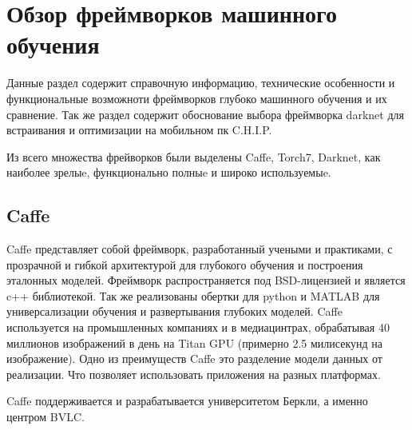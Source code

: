 \documentclass[a4paper,english,russian]{G2-105}
\begin{document}
\chapter{Обзор фреймворков машинного обучения}
\par Данные раздел содержит справочную информацию, технические особенности и функциональные возможноти фреймворков глубоко машинного обучения и их сравнение. Так же раздел содержит обоснование выбора фреймворка darknet для встраивания и оптимизации на мобильном пк C.H.I.P.
\par Из всего множества фрейворков были выделены Caffe, Torch7, Darknet, как наиболее зрелыe, функционально полныe и широко используемыe.
\section{Caffe}
\par Caffe представляет собой фреймворк, разработанный учеными и практиками, с прозрачной и гибкой архитектурой для глубокого обучения и построения эталонных моделей. Фреймворк распространяется под BSD-лицензией и является c++ библиотекой. Так же реализованы обертки для python и MATLAB для универсализации обучения и развертывания глубоких моделей. Caffe используется на промышленных компаниях и в медиацинтрах, обрабатывая 40 миллионов изображений в день на Titan GPU (примерно 2.5 милисекунд на изображение). Одно из преимуществ Caffe это разделение модели данных от реализации. Что позволяет использовать приложения на разных платформах.
\par Caffe поддерживается и разрабатывается университетом Беркли, а именно центром BVLC.
\end{document}
